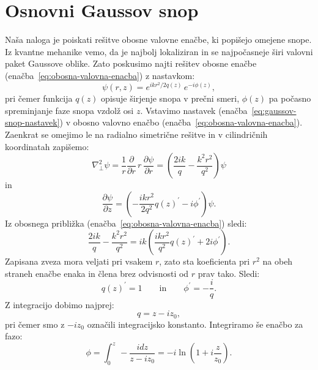 \section{Osnovni Gaussov snop}
\label{chap:gaussovsnop}
Naša naloga je poiskati rešitve obosne valovne enačbe, ki popišejo omejene
snope. Iz kvantne mehanike vemo, da je najbolj lokaliziran in se najpočasneje
širi valovni paket Gaussove oblike. Zato poskusimo najti rešitev obosne
enačbe (enačba~\ref{eq:obosna-valovna-enacba}) z nastavkom:
\begin{equation}
\psi(r,z)=e^{ikr^{2}/2q(z)}\, e^{-i\phi(z)},\label{eq:gaussov-snop-nastavek}
\end{equation}
pri čemer funkcija $q(z)$ opisuje širjenje snopa v prečni smeri,
$\phi(z)$ pa počasno spreminjanje faze snopa vzdolž osi $z$.
Vstavimo nastavek (enačba~\ref{eq:gaussov-snop-nastavek}) v obosno valovno enačbo 
(enačba~\ref{eq:obosna-valovna-enacba}). Zaenkrat se omejimo le na radialno 
simetrične rešitve in v cilindričnih koordinatah zapišemo:
\begin{equation}
\nabla_{\perp}^{2}\psi=\frac{1}{r}\frac{\partial}{\partial r}\, r\,\frac{\partial\psi}{\partial r}=
\left( \frac{2ik}{q}-\frac{k^2r^2}{q^2}\right)\psi
\end{equation}
 in 
\begin{equation}
\frac{\partial\psi}{\partial z}=\left(-\frac{ikr^{2}}{2q^2}q(z)^{\prime}-i\phi^{\prime}\right)\psi.
\end{equation}
Iz obosnega približka (enačba~\ref{eq:obosna-valovna-enacba}) sledi:
\begin{equation}
\frac{2ik}{q}-\frac{k^2r^2}{q^2}=ik\left(\frac{ikr^{2}}{q^2}q(z)^{\prime}+2i\phi^{\prime}\right)\!\!.
\end{equation}
Zapisana zveza mora veljati pri vsakem $r$, zato sta koeficienta
pri $r^{2}$ na obeh straneh enačbe enaka in člena brez odvisnosti od $r$ prav tako. Sledi:
\begin{equation}
q(z)^{\prime}=1 \qquad \mathrm{in} \qquad \phi^{\prime}=-\frac{i}{q}.
\end{equation}
Z integracijo dobimo najprej:
\begin{equation}
q=z-iz_{0},
\label{eq:alpha}
\end{equation}
pri čemer smo z $-i z_{0}$ označili integracijsko konstanto. 
Integriramo še enačbo za fazo:
\begin{equation}
\phi=\int_{0}^{z}\,-\frac{i dz}{z-iz_{0}}=-i\ln(1+i\frac{z}{z_{0}}).
\end{equation}
